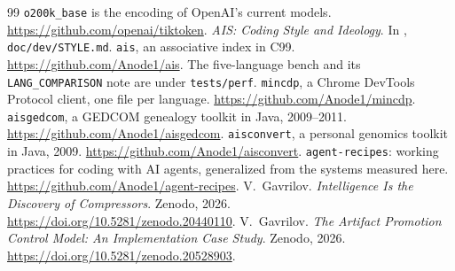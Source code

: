 \documentclass[journal]{IEEEtran}
\begin{document}
\begin{thebibliography}{99}
\texttt{o200k\_base} is the encoding of OpenAI's current models.
\url{https://github.com/openai/tiktoken}.
 \emph{AIS: Coding Style and Ideology}. In \cite{ais},
\texttt{doc/dev/STYLE.md}.
 \texttt{ais}, an associative index in C99.
\url{https://github.com/Anode1/ais}. The five-language bench and its
\texttt{LANG\_COMPARISON} note are under \texttt{tests/perf}.
 \texttt{mincdp}, a Chrome DevTools Protocol client, one
file per language. \url{https://github.com/Anode1/mincdp}.
 \texttt{aisgedcom}, a GEDCOM genealogy toolkit in Java,
2009--2011. \url{https://github.com/Anode1/aisgedcom}.
 \texttt{aisconvert}, a personal genomics toolkit in
Java, 2009. \url{https://github.com/Anode1/aisconvert}.
 \texttt{agent-recipes}: working practices for coding
with AI agents, generalized from the systems measured here.
\url{https://github.com/Anode1/agent-recipes}.
 V.~Gavrilov. \emph{Intelligence Is the Discovery of
Compressors}. Zenodo, 2026. \url{https://doi.org/10.5281/zenodo.20440110}.
 V.~Gavrilov. \emph{The Artifact Promotion Control Model:
An Implementation Case Study}. Zenodo, 2026.
\url{https://doi.org/10.5281/zenodo.20528903}.
\end{thebibliography}
\end{document}
